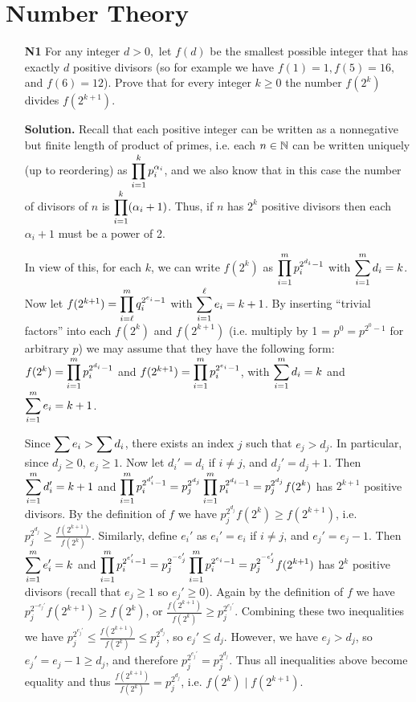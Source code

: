 \documentclass[11pt,a4paper]{article}
\begin{document}
\section*{Number Theory}
\begin{enumerate}
	\item [\textbf{N1}] For any integer $d > 0,$ let $f(d)$ be the smallest possible integer that has exactly $d$ positive divisors (so for example we have $f(1)=1, f(5)=16,$ and $f(6)=12$). Prove that for every integer $k \geq 0$ the number $f\left(2^k\right)$ divides $f\left(2^{k+1}\right).$
	
	\textbf{Solution.} Recall that each positive integer can be written as a nonnegative but finite length of product of primes, i.e. each $n\in\mathbb{N}$ can be written uniquely (up to reordering) as $\displaystyle\prod_{i=1}^k p_i^{\alpha_i}$, and we also know that in this case the number of divisors of $n$ is $\displaystyle\prod_{i=1}^k (\alpha_i+1)$. Thus, if $n$ has $2^k$ positive divisors then each $\alpha_i+1$ must be a power of 2. 
	
	In view of this, for each $k$, we can write $f(2^k)$ as 
	$\displaystyle\prod_{i=1}^m p_i^{2^{d_i}-1}$ with $\displaystyle\sum_{i=1}^m d_i=k$. 
	Now let $f(2^{k+1})=\displaystyle\prod_{i=\ell}^m q_i^{2^{e_i}-1}$ with $\displaystyle\sum_{i=1}^{\ell} e_i=k+1$. By inserting ``trivial factors'' into each $f(2^k)$ and $f(2^{k+1})$ (i.e. multiply by 1 = $p^0=p^{2^0-1}$ for arbitrary $p$) we may assume that they have the following form: 
	$f(2^k)=\displaystyle\prod_{i=1}^m p_i^{2^{d_i}-1}$ and $f(2^{k+1})=\displaystyle\prod_{i=1}^m p_i^{2^{e_i}-1}$, with $\displaystyle\sum_{i=1}^m d_i=k$ and $\displaystyle\sum_{i=1}^m e_i=k+1$. 
	
	Since $\displaystyle\sum e_i>\displaystyle\sum d_i$, there exists an index $j$ such that $e_j>d_j$. In particular, since $d_j\ge 0$, $e_j\ge 1$. Now let $d_i'=d_i$ if $i\neq j$, and $d_j'=d_j+1$. Then $\displaystyle\sum_{i=1}^m d_i'=k+1$ and 
	$\displaystyle\prod_{i=1}^m p_i^{2^{d_i'}-1}=p_j^{2^{d_j}}\displaystyle\prod_{i=1}^m p_i^{2^{d_i}-1}=p_j^{2^{d_j}}f(2^k)$ has $2^{k+1}$ positive divisors. By the definition of $f$ we have $p_j^{2^{d_j}}f(2^k)\ge f(2^{k+1})$, 
	i.e. $p_j^{2^{d_j}}\ge \frac{f(2^{k+1})}{f(2^k)}$. 
	Similarly, define $e_i'$ as $e_i'=e_i$ if $i\neq j$, and $e_j'=e_j-1$. 
	Then $\displaystyle\sum_{i=1}^m e_i'=k$ and $\displaystyle\prod_{i=1}^m p_i^{2^{e_i'}-1}=p_j^{2^{-e_j'}}\displaystyle\prod_{i=1}^m p_i^{2^{e_i}-1}=p_j^{2^{-e_j'}} f(2^{k+1})$ has $2^k$ positive divisors (recall that $e_j\ge 1$ so $e_j'\ge 0$). 
	Again by the definition of $f$ we have $p_j^{2^{-e_j'}} f(2^{k+1})\ge f(2^k)$, or 
	$\frac{f(2^{k+1})}{f(2^k)}\ge p_j^{2^{e_j'}}. $ 
	Combining these two inequalities we have $p_j^{2^{e_j'}}\le \frac{f(2^{k+1})}{f(2^k)}\le p_j^{2^{d_j}}$, so $e_j'\le d_j$. However, we have $e_j>d_j$, so $e_j'=e_j-1\ge d_j$, and therefore $p_j^{2^{e_j'}}=p_j^{2^{d_j}}$. 
	Thus all inequalities above become equality and thus $\frac{f(2^{k+1})}{f(2^k)}= p_j^{2^{d_j}}$, i.e. $f(2^k)\mid f(2^{k+1})$. 
	

\end{enumerate}
\end{document}

